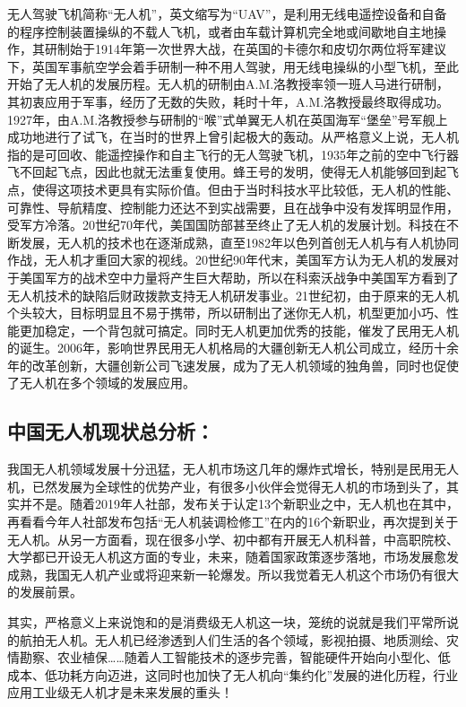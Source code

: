 \documentclass{article}
\begin{document}
无人驾驶飞机简称“无人机”，英文缩写为“UAV”，是利用无线电遥控设备和自备的程序控制装置操纵的不载人飞机，或者由车载计算机完全地或间歇地自主地操作，其研制始于1914年第一次世界大战，在英国的卡德尔和皮切尔两位将军建议下，英国军事航空学会着手研制一种不用人驾驶，用无线电操纵的小型飞机，至此开始了无人机的发展历程。无人机的研制由A.M.洛教授率领一班人马进行研制，其初衷应用于军事，经历了无数的失败，耗时十年，A.M.洛教授最终取得成功。1927年，由A.M.洛教授参与研制的“喉”式单翼无人机在英国海军“堡垒”号军舰上成功地进行了试飞，在当时的世界上曾引起极大的轰动。从严格意义上说，无人机指的是可回收、能遥控操作和自主飞行的无人驾驶飞机，1935年之前的空中飞行器飞不回起飞点，因此也就无法重复使用。蜂王号的发明，使得无人机能够回到起飞点，使得这项技术更具有实际价值。但由于当时科技水平比较低，无人机的性能、可靠性、导航精度、控制能力还达不到实战需要，且在战争中没有发挥明显作用，受军方冷落。20世纪70年代，美国国防部甚至终止了无人机的发展计划。科技在不断发展，无人机的技术也在逐渐成熟，直至1982年以色列首创无人机与有人机协同作战，无人机才重回大家的视线。20世纪90年代末，美国军方认为无人机的发展对于美国军方的战术空中力量将产生巨大帮助，所以在科索沃战争中美国军方看到了无人机技术的缺陷后财政拨款支持无人机研发事业。21世纪初，由于原来的无人机个头较大，目标明显且不易于携带，所以研制出了迷你无人机，机型更加小巧、性能更加稳定，一个背包就可搞定。同时无人机更加优秀的技能，催发了民用无人机的诞生。2006年，影响世界民用无人机格局的大疆创新无人机公司成立，经历十余年的改革创新，大疆创新公司飞速发展，成为了无人机领域的独角兽，同时也促使了无人机在多个领域的发展应用。\par


\subsection{中国无人机现状总分析：\citep{2}}

我国无人机领域发展十分迅猛，无人机市场这几年的爆炸式增长，特别是民用无人机，已然发展为全球性的优势产业，有很多小伙伴会觉得无人机的市场到头了，其实并不是。随着2019年人社部，发布关于认定13个新职业之中，无人机也在其中，再看看今年人社部发布包括“无人机装调检修工”在内的16个新职业，再次提到关于无人机。从另一方面看，现在很多小学、初中都有开展无人机科普，中高职院校、大学都已开设无人机这方面的专业，未来，随着国家政策逐步落地，市场发展愈发成熟，我国无人机产业或将迎来新一轮爆发。所以我觉着无人机这个市场仍有很大的发展前景。\par

其实，严格意义上来说饱和的是消费级无人机这一块，笼统的说就是我们平常所说的航拍无人机。无人机已经渗透到人们生活的各个领域，影视拍摄、地质测绘、灾情勘察、农业植保……随着人工智能技术的逐步完善，智能硬件开始向小型化、低成本、低功耗方向迈进，这同时也加快了无人机向“集约化”发展的进化历程，行业应用工业级无人机才是未来发展的重头！\par
\end{document}
